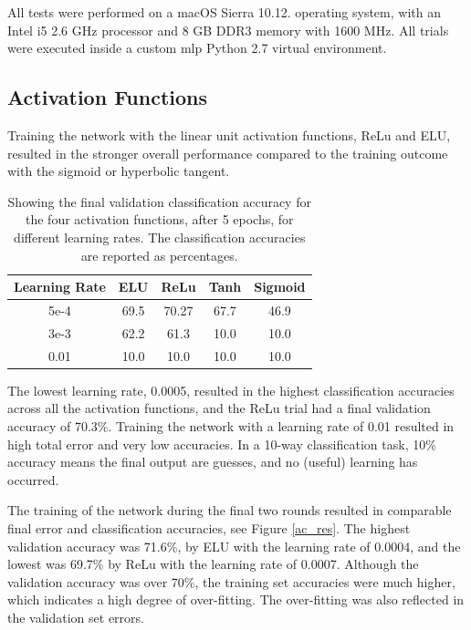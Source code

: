 \documentclass[]{article}
\begin{document}
All tests were performed on a macOS Sierra 10.12. operating system, with an Intel i5 2.6 GHz processor and 8 GB DDR3 memory with 1600 MHz. All trials were executed inside a custom mlp Python 2.7 virtual environment. 

\subsection{Activation Functions}

Training the network with the linear unit activation functions, ReLu and ELU, resulted in the stronger overall performance compared to the training outcome with the sigmoid or hyperbolic tangent. 

\begin{table}[h]
	\centering
	\caption{Showing the final validation classification accuracy  for the four activation functions, after 5 epochs, for different learning rates. The classification accuracies are reported as percentages.}
	\label{ac-table}
	\begin{tabular}{@{}c|cccc@{}}
		\toprule
		Learning Rate & ELU & ReLu & Tanh & Sigmoid \\ \midrule
		5e-4 & 69.5 & 70.27 & 67.7 & 46.9 \\
		3e-3 & 62.2 & 61.3 & 10.0 & 10.0 \\
		0.01 & 10.0 & 10.0 & 10.0 & 10.0 \\ \bottomrule
	\end{tabular}
\end{table}

The lowest learning rate, 0.0005, resulted in the highest classification accuracies across all the activation functions, and the ReLu trial had a final validation accuracy of 70.3\%. Training the network with a learning rate of 0.01 resulted in high total error and very low accuracies. In a 10-way classification task, 10\% accuracy means the final output are guesses, and no (useful) learning has occurred.

The training of the network during the final two rounds resulted in comparable final error and classification accuracies, see Figure \ref{ac_res}. The highest validation accuracy was 71.6\%, by ELU with the learning rate of 0.0004, and the lowest was 69.7\% by ReLu with the learning rate of 0.0007. Although the validation accuracy was over 70\%, the training set accuracies were much higher, which indicates a high degree of over-fitting. The over-fitting was also reflected in the validation set errors.
\end{document}
